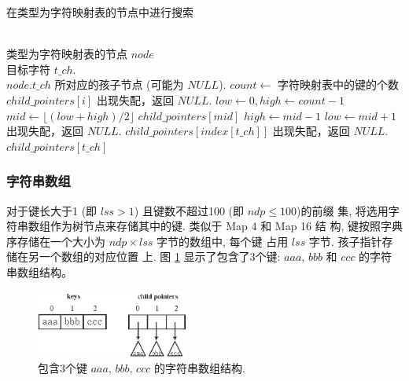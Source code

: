 \begin{algorithm}
  \caption{在类型为字符映射表的节点中进行搜索}\scriptsize
  \label{alg:character map}
  \begin{algorithmic}[1]
    \REQUIRE ~~\\
    类型为字符映射表的节点 $node$\\
    目标字符 $t\_ch$.
    \ENSURE ~~\\
     $node.t\_ch$ 所对应的孩子节点 (可能为 $NULL$).
    \STATE
    \STATE $count \leftarrow$ 字符映射表中的键的个数
    \STATE
    \RETURN $child\_pointers[i]$
    \ENDIF
    \ENDFOR
    \STATE 出现失配，返回 $NULL$.
    \ENDCASE
    \STATE
    \STATE $low \leftarrow 0, high \leftarrow count-1$
    \STATE $mid \leftarrow \lfloor (low+high)/2 \rfloor$
    \RETURN $child\_pointers[mid]$
    \STATE $high \leftarrow mid-1$
    \ELSE
    \STATE $low \leftarrow mid+1$
    \ENDIF
    \ENDWHILE
    \STATE 出现失配，返回 $NULL$.
    \ENDCASE
    \STATE
    \RETURN $child\_pointers[index[t\_ch]]$
    \ELSE
    \STATE 出现失配，返回 $NULL$.
    \ENDIF
    \ENDCASE
    \STATE
    \RETURN $child\_pointers[t\_ch]$
    \ENDCASE
    \ENDPWITCH
  \end{algorithmic}
\end{algorithm}

\subsubsection{字符串数组}
\label{sec:string array}

对于键长大于1 (即 $lss > 1$) 且键数不超过100 (即 $ndp \leq 100$)的前缀
集, 将选用字符串数组作为树节点来存储其中的键. 类似于 Map 4 和 Map 16 结
构, 键按照字典序存储在一个大小为 $ndp \times lss$ 字节的数组中, 每个键
占用 $lss$ 字节. 孩子指针存储在另一个数组的对应位置
上. 图 \ref{fig:string array} 显示了包含了3个键: $aaa$, $bbb$ 和 $ccc$
的字符串数组结构。

\begin{figure}[!h]
  \centering
  \includegraphics[width=0.45\textwidth]{figures/2_MPM/string_array}
  \caption{包含3个键 $aaa,\, bbb,\, ccc$ 的字符串数组结构.}
  \label{fig:string array}
\end{figure}

